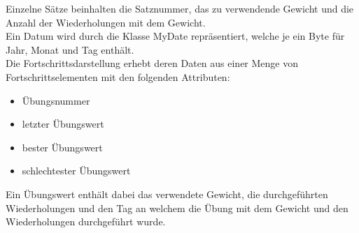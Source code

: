 Einzelne Sätze beinhalten die Satznummer, das zu verwendende Gewicht und die Anzahl der Wiederholungen mit dem Gewicht.
\\

Ein Datum wird durch die Klasse MyDate repräsentiert, welche je ein Byte für Jahr, Monat und Tag enthält.
\\

Die Fortschrittsdarstellung erhebt deren Daten aus einer Menge von Fortschrittselementen mit den folgenden Attributen:
\begin{itemize}
\item Übungsnummer
\item letzter Übungswert
\item bester Übungswert
\item schlechtester Übungswert
\end{itemize}
Ein Übungswert enthält dabei das verwendete Gewicht, die durchgeführten Wiederholungen und den Tag an welchem die Übung mit dem Gewicht und den Wiederholungen durchgeführt wurde.